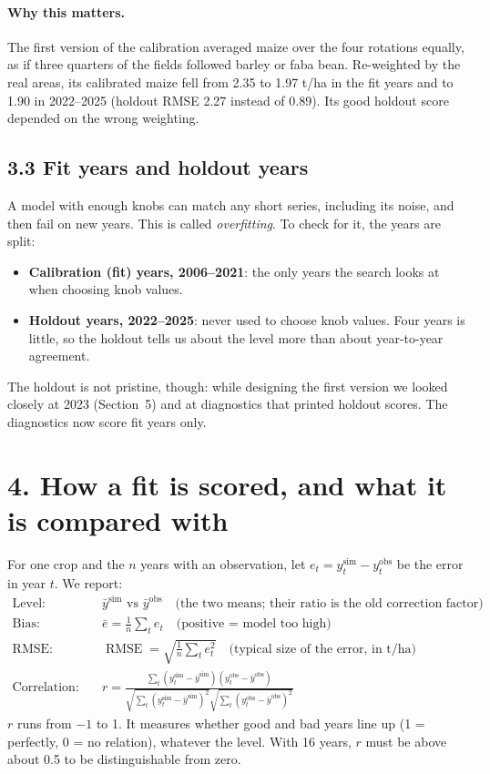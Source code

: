 \documentclass[11pt,a4paper]{article}
\newcommand{\RMSE}{\operatorname{RMSE}}
\begin{document}
\paragraph{Why this matters.} The first version of the calibration averaged maize over the four rotations equally,
as if three quarters of the fields followed barley or faba bean. Re-weighted by the real areas, its calibrated maize
fell from 2.35 to 1.97 t/ha in the fit years and to 1.90 in 2022--2025 (holdout RMSE 2.27 instead of 0.89). Its good
holdout score depended on the wrong weighting.

\subsection*{3.3 Fit years and holdout years}

A model with enough knobs can match any short series, including its noise, and then fail on new years. This is
called \emph{overfitting}. To check for it, the years are split:
\begin{itemize}[nosep]
  \item \textbf{Calibration (fit) years, 2006--2021}: the only years the search looks at when choosing knob values.
  \item \textbf{Holdout years, 2022--2025}: never used to choose knob values. Four years is little, so the holdout
        tells us about the level more than about year-to-year agreement.
\end{itemize}
The holdout is not pristine, though: while designing the first version we looked closely at 2023 (Section~5) and at
diagnostics that printed holdout scores. The diagnostics now score fit years only.

\section*{4. How a fit is scored, and what it is compared with}

For one crop and the \(n\) years with an observation, let \(e_t = y^{\mathrm{sim}}_t - y^{\mathrm{obs}}_t\) be
the error in year \(t\). We report:
\begin{align}
  \text{Level:}\quad & \bar y^{\mathrm{sim}} \text{ vs } \bar y^{\mathrm{obs}}
      \quad\text{(the two means; their ratio is the old correction factor)}\\
  \text{Bias:}\quad & \bar e = \frac{1}{n}\sum_t e_t \quad\text{(positive = model too high)}\\
  \text{RMSE:}\quad & \RMSE = \sqrt{\frac{1}{n}\sum_t e_t^2} \quad\text{(typical size of the error, in t/ha)}\\
  \text{Correlation:}\quad & r = \frac{\sum_t (y^{\mathrm{sim}}_t - \bar y^{\mathrm{sim}})(y^{\mathrm{obs}}_t - \bar y^{\mathrm{obs}})}
      {\sqrt{\sum_t (y^{\mathrm{sim}}_t - \bar y^{\mathrm{sim}})^2}\sqrt{\sum_t (y^{\mathrm{obs}}_t - \bar y^{\mathrm{obs}})^2}}
\end{align}
\(r\) runs from \(-1\) to 1. It measures whether good and bad years line up (1 = perfectly, 0 = no relation),
whatever the level. With 16 years, \(r\) must be above about 0.5 to be distinguishable from zero.
\end{document}
